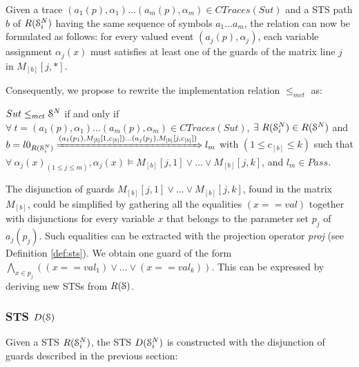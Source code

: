 Given a trace $(a_1(p), \alpha_1) \dots (a_m(p), \alpha_m) \in
CTraces({Sut})$ and a STS path $b$ of $R(\EuScript{S}_i^{N})$
having the same sequence of symbols $a_1 \dots a_m$, the relation
can now be formulated as follows: for every valued event
$(a_j(p), \alpha_j)$, each variable assignment $\alpha_j(x)$ must
satisfies at least one of the guards of the matrix line $j$ in
$M_{[b]}[j,*]$.

Consequently, we propose to rewrite the implementation relation
$\leq_{mct}$ as:

\begin{proposition}
    ${Sut} \leq_{mct} \EuScript{S}^{N}$ if and only if
    $\forall ~t = (a_1(p), \alpha_1) \dots (a_m(p), \alpha_m) \in
    CTraces({Sut})$, $\exists ~R(\EuScript{S}_i^{N}) \in
    R(\EuScript{S}^{N})$ and
    $b = l0_{R(\EuScript{S}_i^{N})}
    \xRightarrow{(a_1(p_1),M_{[b]}[1,c_{[b]}]) \dots (a_j(p_j),M_{[b]}[j,c_{[b]}])}
    l_m$
    with $(1 \leq c_{[b]} \leq k)$ such that $\forall
    ~\alpha_j(x)_{(1 \leq j \leq m)}, \alpha_j(x) \models
    M_{[b]}[j,1] \vee \dots \vee  M_{[b]}[j,k]$, and $l_m \in Pass$.
\end{proposition}

The disjunction of guards $M_{[b]}[j,1] \vee \dots \vee
M_{[b]}[j,k]$, found in the matrix $M_{[b]}$, could be simplified
by gathering all the equalities $(x == val)$ together with
disjunctions for every variable $x$ that belongs to the parameter
set $p_j$ of $a_j(p_j)$. Such equalities can be extracted with
the projection operator \textit{proj} (see Definition
\ref{def:sts}). We obtain one guard of the form $\displaystyle
\bigwedge_{x \in p_j} ((x == val_1) \vee \dots \vee (x ==
val_k))$. This can be expressed by deriving new STSs from
$R(\EuScript{S})$.

\subsubsection{STS $D(\EuScript{S})$}

Given a STS $R(\EuScript{S}_i^{N})$, the STS
$D(\EuScript{S}_i^{N})$ is constructed with the disjunction of
guards described in the previous section:

